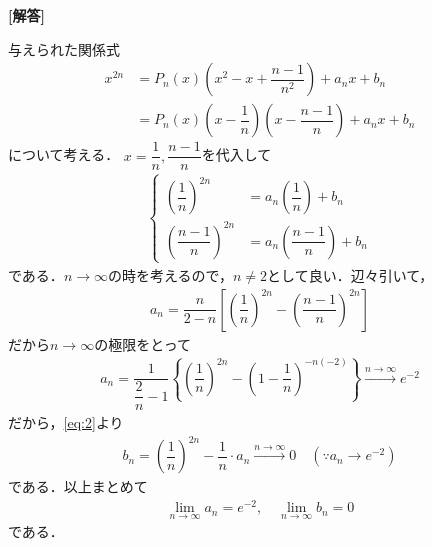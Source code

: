 \documentclass[../../main.tex]{subfiles}
\begin{document}
\begin{oframed}
  
\end{oframed}

{\bf [解答]}

与えられた関係式
\begin{align}
  x^{2n}
  & =P_n(x) \left( x^2-x+\dfrac{n-1}{n^2} \right) +a_nx+b_n \\
  & =P_n(x) \left(x-\dfrac{1}{n}\right)\left(x-\dfrac{n-1}{n}\right) +a_nx+b_n \label{eq:1}
\end{align}
について考える．
$x=\dfrac{1}{n},\dfrac{n-1}{n}$を代入して
\begin{align}
  \begin{cases}
    \left(\dfrac{1}{n}\right)^{2n}&=a_n\left(\dfrac{1}{n}\right)+b_n\\
    \left(\dfrac{n-1}{n}\right)^{2n}&=a_n\left(\dfrac{n-1}{n}\right)+b_n
  \end{cases} \label{eq:2}
\end{align}
である．$n\to\infty$の時を考えるので，$n\ne 2$として良い．辺々引いて，
\begin{align}
  a_n = \dfrac{n}{2-n}\left[\left(\dfrac{1}{n}\right)^{2n}-\left(\dfrac{n-1}{n}\right)^{2n}\right]
\end{align}
だから$n\to\infty$の極限をとって
\begin{align}
  a_n=\dfrac{1}{\dfrac{2}{n}-1}\left\{\left(\dfrac{1}{n}\right)^{2n}-\left(1-\dfrac{1}{n}\right)^{-n(-2)}\right\}\xrightarrow{n\to\infty} e^{-2}
\end{align}
だから，\cref{eq:2}より
\begin{align}
  b_n=\left(\dfrac{1}{n}\right)^{2n}-\dfrac{1}{n}\cdot a_n\xrightarrow{n\to\infty} 0 \quad(\because a_n\to e^{-2})
\end{align}
である．以上まとめて
\begin{align}
  \lim_{n\to\infty}a_n = e^{-2}, \quad
  \lim_{n\to\infty}b_n = 0
\end{align}
である．

\newpage
\end{document}
